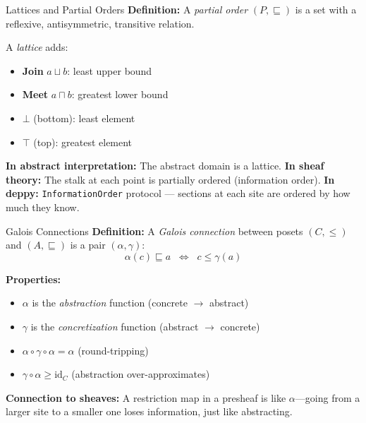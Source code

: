 \documentclass[aspectratio=169,10pt]{beamer}
\newcommand{\id}{\mathrm{id}}
\begin{document}
\begin{frame}{Lattices and Partial Orders}
\textbf{Definition:} A \emph{partial order} $(P, \sqsubseteq)$ is a set with a reflexive, antisymmetric, transitive relation.

A \emph{lattice} adds:
\begin{itemize}
  \item \textbf{Join} $a \sqcup b$: least upper bound
  \item \textbf{Meet} $a \sqcap b$: greatest lower bound
  \item $\bot$ (bottom): least element
  \item $\top$ (top): greatest element
\end{itemize}

\vspace{0.3em}
\textbf{In abstract interpretation:} The abstract domain is a lattice.
\textbf{In sheaf theory:} The stalk at each point is partially ordered (information order).
\textbf{In deppy:} \texttt{InformationOrder} protocol --- sections at each site are ordered by how much they know.
\end{frame}

\begin{frame}{Galois Connections}
\textbf{Definition:} A \emph{Galois connection} between posets $(C, \leq)$ and $(A, \sqsubseteq)$ is a pair $(\alpha, \gamma)$:
\[
\alpha(c) \sqsubseteq a \;\;\Leftrightarrow\;\; c \leq \gamma(a)
\]

\textbf{Properties:}
\begin{itemize}
  \item $\alpha$ is the \emph{abstraction} function (concrete $\to$ abstract)
  \item $\gamma$ is the \emph{concretization} function (abstract $\to$ concrete)
  \item $\alpha \circ \gamma \circ \alpha = \alpha$ (round-tripping)
  \item $\gamma \circ \alpha \geq \id_C$ (abstraction over-approximates)
\end{itemize}

\vspace{0.3em}
\textbf{Connection to sheaves:} A restriction map in a presheaf is like $\alpha$---going from a larger site to a smaller one loses information, just like abstracting.
\end{frame}
\end{document}
